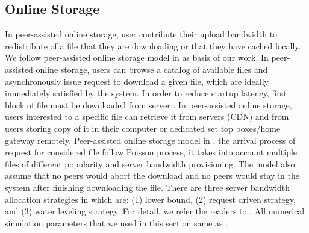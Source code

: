 \documentclass[JIP]{ipsj}
\begin{document}
\subsection{Online Storage}

In peer-assisted online storage, user contribute their upload bandwidth to redistribute of a file that they are downloading or that they have cached locally.
We follow peer-assisted online storage model in \cite{Sun:2009:POS:1542245.1542249} as basis of our work. 
In peer-assisted online storage, users can browse a catalog of available files and asynchronously issue request to download a given file, which are ideally immediately satisfied by the system.
In order to reduce startup latency, first block of file must be downloaded from server \cite{5199550}.
In peer-assisted online storage, users interested to a specific file can retrieve it from servers (CDN) and from users storing copy of it in their computer or dedicated set top boxes/home gateway remotely.  
Peer-assisted online storage model in \cite{Sun:2009:POS:1542245.1542249}, the arrival process of request for considered file follow Poisson process, it takes into account multiple files of different popularity and server bandwidth provisioning.
The model also assume that no peers would abort the download and no peers would stay in the system after finishing downloading the file.
There are three server bandwidth allocation strategies in \cite{Sun:2009:POS:1542245.1542249} which are: (1) lower bound, (2) request driven strategy, and (3) water leveling strategy.
For detail, we refer the readers to \cite{Sun:2009:POS:1542245.1542249,5199550,5061997}.
All numerical simulation parameters that we used in this section same as \cite{Sun:2009:POS:1542245.1542249}.



\end{document}
